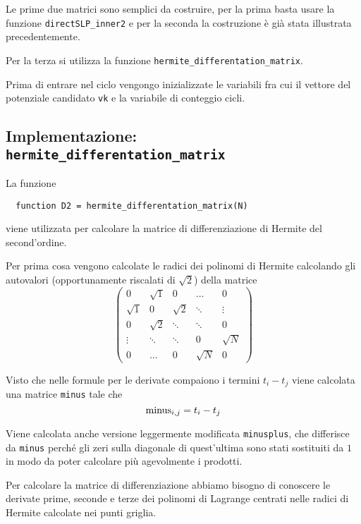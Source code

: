 \documentclass[a4paper,10pt]{article}
\theoremstyle{plain}
\theoremstyle{definition}
\theoremstyle{remark}
\begin{document}
Le prime due matrici sono semplici da costruire, per la prima basta
usare la funzione \lstinline{directSLP_inner2} e per la seconda la
  costruzione è già stata illustrata precedentemente.

Per la terza si utilizza la funzione
\lstinline{hermite_differentation_matrix}.

Prima di entrare nel ciclo vengongo inizializzate le variabili fra cui
il vettore del potenziale candidato \lstinline{vk} e la variabile di
conteggio cicli.

\subsection{Implementazione: \lstinline{hermite_differentation_matrix}}

La funzione
\begin{lstlisting}
  function D2 = hermite_differentation_matrix(N)
\end{lstlisting}
viene utilizzata per calcolare la matrice di differenziazione di
Hermite del second'ordine.

Per prima cosa vengono calcolate le radici dei polinomi di Hermite
calcolando gli autovalori (opportunamente riscalati di $\sqrt{2}$)
della matrice
\begin{equation*}
  \begin{pmatrix}
    0 & \sqrt{1} & 0 & \dots & 0 \\
    \sqrt{1} & 0 & \sqrt{2} & \ddots & \vdots \\
    0 & \sqrt{2} & \ddots & \ddots & 0 \\
    \vdots & \ddots & \ddots & 0 & \sqrt{N} \\
    0 & \dots & 0 & \sqrt{N} & 0
  \end{pmatrix}
\end{equation*}

Visto che nelle formule per le derivate compaiono i termini $t_i -t_j$
viene calcolata una matrice \lstinline{minus} tale che
\[ \lstinline{minus} _{i,j} = t_i - t_j \]

Viene calcolata anche versione leggermente modificata
\lstinline{minusplus}, che differisce da \lstinline{minus} perché gli
zeri sulla diagonale di quest'ultima sono stati sostituiti da $1$ in
modo da poter calcolare più agevolmente i prodotti.

Per calcolare la matrice di differenziazione abbiamo bisogno di
conoscere le derivate prime, seconde e terze dei polinomi di Lagrange
centrati nelle radici di Hermite calcolate nei punti griglia.
\end{document}

